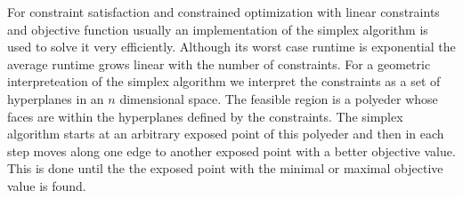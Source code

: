 For constraint satisfaction and constrained optimization with linear constraints and objective function usually an implementation of the simplex algorithm \cite{dantzig63Simplex} is used to solve it very efficiently. Although its worst case runtime is exponential the average runtime grows linear with the number of constraints. For a geometric interpreteation of the simplex algorithm we interpret the constraints as a set of hyperplanes in an $n$ dimensional space. The feasible region is a polyeder whose faces are within the hyperplanes defined by the constraints. The simplex algorithm starts at an arbitrary exposed point of this polyeder and then in each step moves along one edge to another exposed point with a better objective value. This is done until the the exposed point with the minimal or maximal objective value is found.

